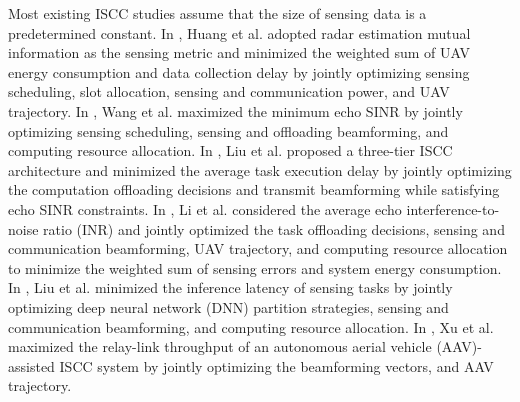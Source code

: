 \documentclass[10pt,journal,compsoc]{IEEEtran}
\begin{document}
Most existing ISCC studies assume that the size of sensing data is a predetermined constant\cite{
Related works:ISCC:IoTJ:Unmanned-Aerial-Vehicle,
Related works:ISCC:TCCN:Collaborative-Optimization-Of,
Related works:ISCC:TCOM:Joint-Offloading-And,
Related works:ISCC:TGCN:Adaptive-Digital-Twin,
Related works:ISCC:TWC:Toward-Intelligent-Edge,
Related works:ISCC:TMC:Joint-Trajectory-And}. 
In \cite{Related works:ISCC:IoTJ:Unmanned-Aerial-Vehicle}, Huang et al. adopted radar estimation mutual information as the sensing metric and minimized the weighted sum of UAV energy consumption and data collection delay by jointly optimizing sensing scheduling, slot allocation, sensing and communication power, and UAV trajectory. 
In \cite{Related works:ISCC:TCCN:Collaborative-Optimization-Of}, Wang et al. maximized the minimum echo SINR by jointly optimizing sensing scheduling, sensing and offloading beamforming, and computing resource allocation. 
In \cite{Related works:ISCC:TCOM:Joint-Offloading-And}, Liu et al. proposed a three-tier ISCC architecture and minimized the average task execution delay by jointly optimizing the computation offloading decisions and transmit beamforming while satisfying echo SINR constraints. 
In \cite{Related works:ISCC:TGCN:Adaptive-Digital-Twin}, Li et al. considered the average echo interference-to-noise ratio (INR) and jointly optimized the task offloading decisions, sensing and communication beamforming, UAV trajectory, and computing resource allocation to minimize the weighted sum of sensing errors and system energy consumption. 
In \cite{Related works:ISCC:TWC:Toward-Intelligent-Edge}, Liu et al. minimized the inference latency of sensing tasks by jointly optimizing deep neural network (DNN) partition strategies, sensing and communication beamforming, and computing resource allocation. 
In \cite{Related works:ISCC:TMC:Joint-Trajectory-And}, Xu et al. maximized the relay-link throughput of an autonomous aerial vehicle (AAV)-assisted ISCC system by jointly optimizing the beamforming vectors, and AAV trajectory.
\end{document}
